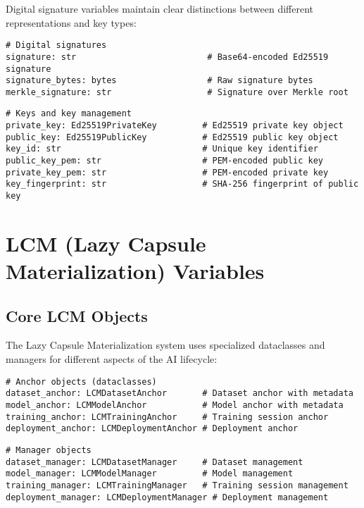 \documentclass[12pt,a4paper]{article}
\begin{document}
Digital signature variables maintain clear distinctions between different representations and key types:

\begin{lstlisting}[caption=Digital Signatures]
# Digital signatures
signature: str                          # Base64-encoded Ed25519 signature
signature_bytes: bytes                  # Raw signature bytes
merkle_signature: str                   # Signature over Merkle root
\end{lstlisting}

\begin{lstlisting}[caption=Keys and Key Management]
# Keys and key management
private_key: Ed25519PrivateKey         # Ed25519 private key object
public_key: Ed25519PublicKey           # Ed25519 public key object
key_id: str                            # Unique key identifier
public_key_pem: str                    # PEM-encoded public key
private_key_pem: str                   # PEM-encoded private key
key_fingerprint: str                   # SHA-256 fingerprint of public key
\end{lstlisting}

\section{LCM (Lazy Capsule Materialization) Variables}

\subsection{Core LCM Objects}

The Lazy Capsule Materialization system uses specialized dataclasses and managers for different aspects of the AI lifecycle:

\begin{lstlisting}[caption=Anchor Objects (Dataclasses)]
# Anchor objects (dataclasses)
dataset_anchor: LCMDatasetAnchor       # Dataset anchor with metadata
model_anchor: LCMModelAnchor           # Model anchor with metadata
training_anchor: LCMTrainingAnchor     # Training session anchor
deployment_anchor: LCMDeploymentAnchor # Deployment anchor
\end{lstlisting}

\begin{lstlisting}[caption=Manager Objects]
# Manager objects
dataset_manager: LCMDatasetManager     # Dataset management
model_manager: LCMModelManager         # Model management  
training_manager: LCMTrainingManager   # Training session management
deployment_manager: LCMDeploymentManager # Deployment management
\end{lstlisting}
\end{document}

